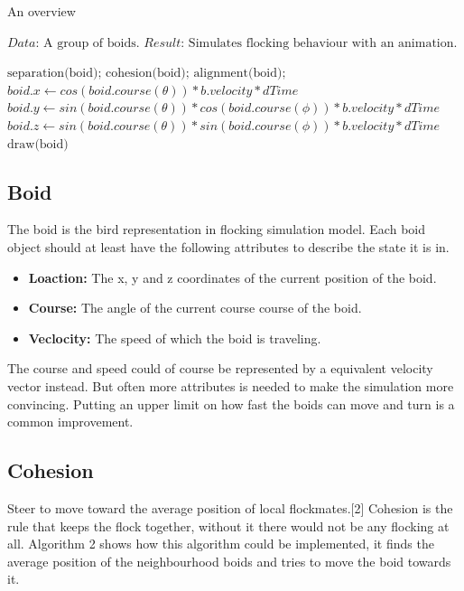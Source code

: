 \documentclass{article}
\begin{document}
\begin{algorithm}
\caption{An overview}\label{euclid}
\begin{algorithmic}[1]
\State $\textit{Data:   } \text{A group of boids.}$
\State $\textit{Result:   } \text{Simulates flocking behaviour with an animation.}$

    \State $\text{separation(boid);} $
    \State $\text{cohesion(boid);} $
    \State $\text{alignment(boid);} $
    \EndFor
    \State $boid.x \gets cos(boid.course(\theta)) * b.velocity * dTime $
    \State $boid.y \gets sin(boid.course(\theta)) * cos(boid.course(\phi)) * b.velocity * dTime $
    \State $boid.z \gets sin(boid.course(\theta)) * sin(boid.course(\phi)) * b.velocity * dTime $
    \State $\text{draw(boid)} $
    \EndFor
\Endfor

\end{algorithmic}

\end{algorithm}

\subsection{Boid}
The boid is the bird representation in flocking simulation model. Each boid object should at least have the following attributes to describe the state it is in.

\begin{itemize}
    \item \textbf{Loaction: } The x, y and z coordinates of the current position of the boid.
    \item \textbf{Course: } The angle of the current course course of the boid.
    \item \textbf{Veclocity: } The speed of which the boid is traveling.
\end{itemize}
\bigbreak
The course and speed could of course be represented by a equivalent velocity vector instead. But often more attributes is needed to make the simulation more convincing. Putting an upper limit on how fast the boids can move and turn is a common improvement.

\subsection{Cohesion}

Steer to move toward the average position of local flockmates.[2] Cohesion is the rule that keeps the flock together, without it there would not be any flocking at all. Algorithm 2 shows how this algorithm could be implemented, it finds the average position of the neighbourhood boids and tries to move the boid towards it.\\
\end{document}
